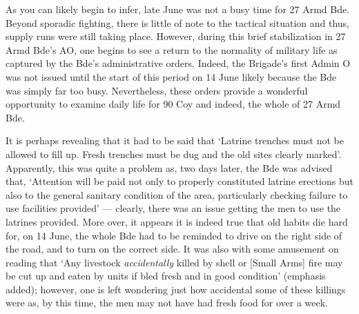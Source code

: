 \documentclass[noraggedright]{turabian-researchpaper}
\begin{document}



As you can likely begin to infer, late June was not a busy time for 27
Armd Bde.  Beyond sporadic fighting, there is little of note to the tactical
situation and thus, supply runs were still taking place. However, during this
brief stabilization in 27 Armd Bde's AO, one begins to see a return to the
normality of military life as captured by the Bde's administrative 
orders.\autocite[See end of June diaries]{27wd}
Indeed, the Brigade's first Admin O was not issued until the start of this
period on 14 June likely because the Bde was simply far too busy.  
Nevertheless, these orders provide a wonderful opportunity to examine daily
life for 90 Coy and indeed, the whole of 27 Armd Bde.  

It is perhaps revealing that it had to be said that `Latrine trenches must
not be allowed to fill up.  Fresh trenches must be dug and the old sites
clearly marked'.\autocite[June Adm Order No. 3][Para 10]{27wd}  Apparently,
this was quite a problem as, two days later, the Bde was advised that, 
`Attention will be paid not only to properly constituted latrine erections but
also to the general sanitary condition of the area, particularly checking 
failure to use facilities provided' --- clearly, there was an issue getting 
the men to use the latrines provided.\autocite[June Adm Order No. 4, Para 1a]
{27wd}  
More over, it appears it is indeed true that old habits die hard for, on 
14 June, the whole Bde had to be reminded to drive on the right side of the
road, and to turn on the correct side.\autocite[June Adm Order No. 1][Para 9]
{27wd}  It was also with some amusement on reading that `Any livestock 
\textit{accidentally} killed by shell or [Small Arms] fire may be cut up 
and eaten by units if bled fresh and in good condition' (emphasis added);
however, one is left wondering just how accidental some of these killings
were as, by this time, the men may not have had fresh food for over a 
week.\autocite[June Adm Order No. 1][Para 10]{27wd}
\end{document}

